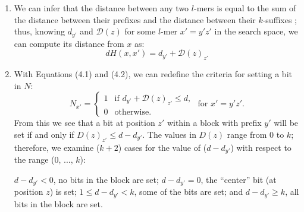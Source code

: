 \documentclass[oneside,12pt]{DISCSthesis}
\begin{document}
{\begin{enumerate}
			\item We can infer that the distance between any two $l$-mers is equal to the sum of the distance between their prefixes and the distance between their $k$-suffixes %
			; thus, knowing $d_{y'}$ and $\mathcal{D}(z)$ for some $l$-mer $x' = y'z'$ in the search space, we can compute its distance from $x$ as:
				\begin{equation}
					dH(x,x') = d_{y'} + \mathcal{D}(z)_{z'}
					\end{equation}

			\item With Equations (4.1) and (4.2), we can redefine the criteria for setting a bit in $N$:
				\begin{equation}
					N_{x'} = \left\{
					\begin{array}{rl}
						1 & \text{if } d_{y'} + \mathcal{D}(z)_{z'} \leq d,\\
						0 & \text{otherwise.}%
					\end{array} \right.
					\text{ for }x' = y'z'.
					\end{equation}
				From this we see that a bit at position $z'$ within a block with prefix $y'$ will be set if and only if $D(z)_{z'} \leq d-d_{y'}$. The values in $D(z)$ range from 0 to $k$; therefore, we examine ($k + 2$) cases for the value of ($d - d_{y'}$) with respect to the range (0, ..., $k$):

					{\small
					\hspace*{40pt}{\bf\boldmath Case $-1$:}
					\hspace*{54pt} $d-d_{y'} < 0$, \hspace*{24pt}no bits in the block are set;\newline
					\hspace*{40pt}{\bf\boldmath Case 0:}
					\hspace*{66pt} $d-d_{y'} = 0$, \hspace*{24pt}the ``center'' bit (at position $z$) is set;\newline
					\hspace*{40pt}{\bf\boldmath\boldmath Cases 1 to $k-1$:}
					\hspace*{11.5pt} $1 \leq d-d_{y'} < k$, \hspace*{5pt}some of the bits are set; and\newline
					\hspace*{40pt}{\bf\boldmath Case $k$:}
					\hspace*{66pt}$d-d_{y'} \geq k$, \hspace*{24pt}all bits in the block are set.}


\end{enumerate}}
\end{document}
